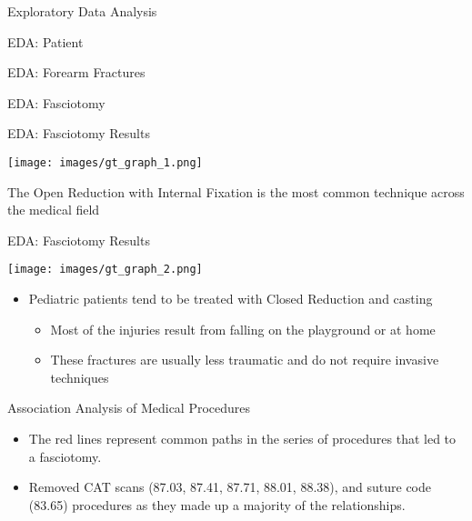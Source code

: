 \documentclass[
  ignorenonframetext,
]{beamer}
\providecommand{\tightlist}{%
  \setlength{\itemsep}{0pt}\setlength{\parskip}{0pt}}
\begin{document}
\begin{frame}{Exploratory Data Analysis}
\protect\hypertarget{exploratory-data-analysis}{}

\begin{block}{EDA: Patient}

\end{block}

\begin{block}{EDA: Forearm Fractures}

\end{block}

\begin{block}{EDA: Fasciotomy}

\end{block}

\begin{block}{EDA: Fasciotomy Results}

\texttt{[image: images/gt\_graph\_1.png]}

The Open Reduction with Internal Fixation is the most common technique
across the medical field

\end{block}

\begin{block}{EDA: Fasciotomy Results}

\texttt{[image: images/gt\_graph\_2.png]}

\begin{itemize}
\tightlist
\item
  Pediatric patients tend to be treated with Closed Reduction and
  casting

  \begin{itemize}
  \tightlist
  \item
    Most of the injuries result from falling on the playground or at
    home
  \item
    These fractures are usually less traumatic and do not require
    invasive techniques
  \end{itemize}
\end{itemize}

\end{block}

\begin{block}{Association Analysis of Medical Procedures}

\begin{itemize}
\tightlist
\item
  The red lines represent common paths in the series of procedures that
  led to a fasciotomy.
\item
  Removed CAT scans (87.03, 87.41, 87.71, 88.01, 88.38), and suture code
  (83.65) procedures as they made up a majority of the relationships.


\end{itemize}
\end{block}
\end{frame}
\end{document}
